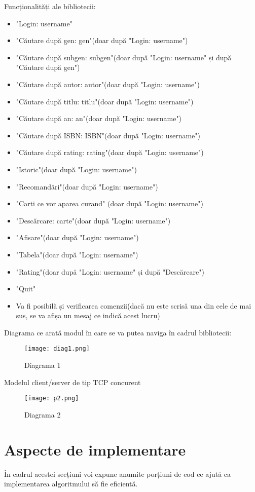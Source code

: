 \documentclass{article}
\begin{document}
Funcționalități ale bibliotecii:
\begin{itemize}
    \item "Login: username"
    \item "Căutare după gen: gen"(doar după "Login: username")
    \item "Căutare după subgen: subgen"(doar după "Login: username" și după "Căutare după gen")
    \item "Căutare după autor: autor"(doar după "Login: username")
    \item "Căutare după titlu: titlu"(doar după "Login: username")
    \item "Căutare după an: an"(doar după "Login: username")
    \item "Căutare după ISBN: ISBN"(doar după "Login: username")
    \item "Căutare după rating: rating"(doar după "Login: username")
    \item "Istoric"(doar după "Login: username")
    \item "Recomandări"(doar după "Login: username")
    \item "Carti ce vor aparea curand" (doar după "Login: username")
    \item "Descărcare: carte"(doar după "Login: username")
    \item "Afisare"(doar după "Login: username")
    \item "Tabela"(doar după "Login: username")
    \item "Rating"(doar după "Login: username" și după "Descărcare")
    \item "Quit"
    \item Va fi posibilă și verificarea comenzii(dacă nu este scrisă una din cele de mai sus, se va afișa un mesaj ce indică acest lucru)
\end{itemize}
\clearpage
Diagrama ce arată modul în care se va putea naviga în cadrul bibliotecii:
\begin{figure}[h]
    \centering
    \texttt{[image: diag1.png]}
    \caption{Diagrama 1}
    \label{fig:enter-label}
\end{figure}
\clearpage
Modelul client/server de tip TCP concurent 
\begin{figure}[h]
    \centering
    \texttt{[image: p2.png]}
    \caption{Diagrama 2}
    \label{fig:enter-label}
\end{figure}

\section{Aspecte de implementare}
\hspace{0.5cm}În cadrul acestei secțiuni voi expune anumite porțiuni de cod ce ajută ca implementarea algoritmului să fie eficientă.
\end{document}
